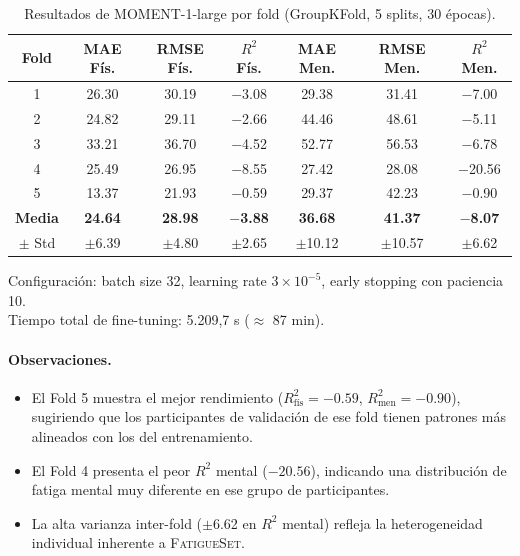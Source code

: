 \documentclass[12pt, a4paper]{article}
\newcommand{\fatigueset}{\textsc{FatigueSet}}
\begin{document}
\begin{table}[H]
\centering
\caption{Resultados de MOMENT-1-large por fold (GroupKFold, 5 splits, 30 épocas).}
\label{tab:moment_folds}
\small
\begin{tabular}{@{}ccccccc@{}}
\toprule
\textbf{Fold} & \textbf{MAE Fís.} & \textbf{RMSE Fís.} & \textbf{$R^2$ Fís.} & \textbf{MAE Men.} & \textbf{RMSE Men.} & \textbf{$R^2$ Men.} \\
\midrule
1 & 26.30 & 30.19 & $-$3.08 & 29.38 & 31.41 & $-$7.00 \\
2 & 24.82 & 29.11 & $-$2.66 & 44.46 & 48.61 & $-$5.11 \\
3 & 33.21 & 36.70 & $-$4.52 & 52.77 & 56.53 & $-$6.78 \\
4 & 25.49 & 26.95 & $-$8.55 & 27.42 & 28.08 & $-$20.56 \\
5 & 13.37 & 21.93 & $-$0.59 & 29.37 & 42.23 & $-$0.90 \\
\midrule
\textbf{Media} & \textbf{24.64} & \textbf{28.98} & \textbf{$-$3.88} & \textbf{36.68} & \textbf{41.37} & \textbf{$-$8.07} \\
$\pm$ Std & $\pm$6.39 & $\pm$4.80 & $\pm$2.65 & $\pm$10.12 & $\pm$10.57 & $\pm$6.62 \\
\bottomrule
\end{tabular}
\begin{flushleft}
\footnotesize
Configuración: batch size 32, learning rate $3 \times 10^{-5}$, early stopping con paciencia 10. \\
Tiempo total de fine-tuning: 5.209,7 s ($\approx$ 87 min).
\end{flushleft}
\end{table}

\paragraph{Observaciones.}
\begin{itemize}
    \item El Fold 5 muestra el mejor rendimiento ($R^2_\text{fís} = -0.59$, $R^2_\text{men} = -0.90$), sugiriendo que los participantes de validación de ese fold tienen patrones más alineados con los del entrenamiento.
    \item El Fold 4 presenta el peor $R^2$ mental ($-20.56$), indicando una distribución de fatiga mental muy diferente en ese grupo de participantes.
    \item La alta varianza inter-fold ($\pm$6.62 en $R^2$ mental) refleja la heterogeneidad individual inherente a \fatigueset{}.
\end{itemize}
\end{document}
